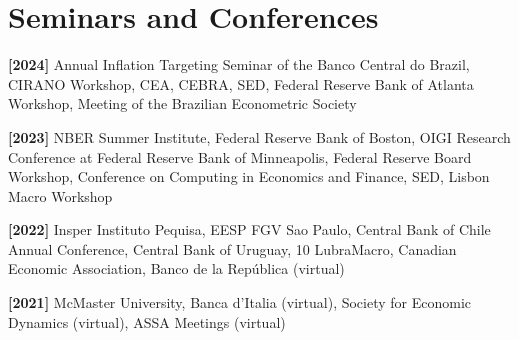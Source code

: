 \documentclass[11pt,letterpaper]{article}
\renewenvironment{itemize}{
  \begin{list}{}{
      \setlength{\leftmargin}{1.5em}
      \setlength{\itemsep}{0.25em}
      \setlength{\parskip}{0pt}
      \setlength{\parsep}{0.25em}
    }
}{
  \end{list}
}
\begin{document}

\section*{Seminars and Conferences}\begin{itemize} 
    \item \textbf{[2024]} Annual Inflation Targeting Seminar of the Banco Central do Brazil, CIRANO Workshop, CEA, CEBRA, SED, Federal Reserve Bank of Atlanta Workshop, Meeting of the Brazilian Econometric Society
    \item \textbf{[2023]} NBER Summer Institute,  Federal Reserve Bank of Boston,  OIGI Research Conference at Federal Reserve Bank of Minneapolis, Federal Reserve Board Workshop, Conference on Computing in Economics and Finance, SED, Lisbon Macro Workshop
    \item \textbf{[2022]} Insper Instituto Pequisa, EESP FGV Sao Paulo, Central Bank of Chile Annual Conference, Central Bank of Uruguay, 10 LubraMacro, Canadian Economic Association, Banco de la República (virtual) 
    \item \textbf{[2021]} McMaster University, Banca d'Italia (virtual), Society for Economic Dynamics (virtual), ASSA Meetings (virtual)

\end{itemize}


\end{document}
